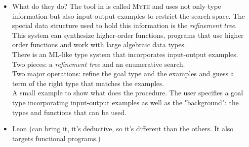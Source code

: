 \begin{itemize}
\item What do they do?
The tool in \cite{MythPaper} is called \textsc{Myth} and uses not only type information but also input-output examples to restrict the search space. The special data structure used to hold this information is the \emph{refinement tree}. This system can synthesize higher-order functions, programs that use higher order functions and work with large algebraic data types.\\
There is an ML-like type system that incorporates input-output examples. Two pieces: a \emph{refinement tree} and an enumerative search.\\
Two major operations: refine the goal type and the examples and guess a term of the right type that matches the examples.\\
A small example to show what does the procedure. The user specifies a goal type incorporating input-output examples as well as the "background": the types and functions that can be used.
\item Leon (can bring it, it's deductive, so it's different than the others. It also targets functional programs.) \cite{LeonPaper}
\end{itemize}






